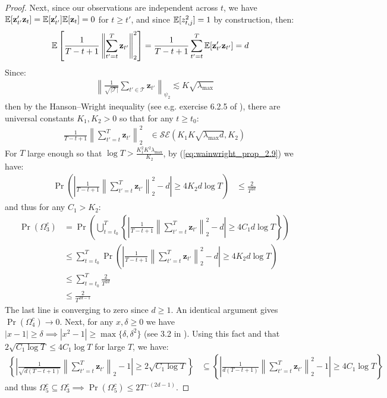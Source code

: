 \begin{proof}
Next, since our observations are independent across $t$, we have $\mathbb{E}[\mathbf{z}'_{t'}\mathbf{z}_{t}] = \mathbb{E}[\mathbf{z}'_{t'}]\mathbb{E}[\mathbf{z}_{t}] = 0$ for $t \geq t'$, and since $\mathbb{E}[z_{t,j}^2] = 1$ by construction, then:
\begin{align*}
    \mathbb{E}\left[ \frac{1}{T-t+1}\left\lVert\sum_{t'=t}^T\mathbf{z}_{t'}\right\rVert_2^2\right] &=  \frac{1}{T-t+1}\sum_{t'=t}^T\mathbb{E}[\mathbf{z}'_{t'}\mathbf{z}_{t'}] = d
\end{align*}
Since:
\begin{align*}
    \left\lVert\frac{1}{\sqrt{|\mathcal{T}|}}\sum_{t'\in\mathcal{T}}\mathbf{z}_{t'}\right\rVert_{\psi_2} \lesssim K\sqrt{\lambda_{\max}}
\end{align*}
then by the Hanson–Wright inequality (see e.g. exercise 6.2.5 of \citealp{Vershynin18}), there are universal constants $K_1,K_2>0$ so that for any $t \geq t_0$:
\begin{align*}
    \frac{1}{T-t+1}\left\lVert\sum_{t'=t}^T\mathbf{z}_{t'}\right\rVert_2^2 &\in \mathcal{SE}(K_1K\sqrt{\lambda_{\max}d},K_2) 
\end{align*}
For $T$ large enough so that $\log T > \frac{K_1^2K^2\lambda_{\max}}{K_2}$, by (\ref{eq:wainwright_prop_2.9}) we have: 
\begin{align*}
    \Pr\left(\left| \frac{1}{T-t+1}\left\lVert\sum_{t'=t}^T\mathbf{z}_{t'}\right\rVert_2^2 - d\right| \geq 4K_2d\log T\right) &\leq \frac{2}{T^{2d}}
\end{align*}
and thus for any $C_1 > K_2$:
\begin{align*}
    \Pr(\Omega^c_3) &= \Pr\left(\bigcup_{t= t_0}^T \left\{\left| \frac{1}{T-t+1}\left\lVert\sum_{t'=t}^T\mathbf{z}_{t'}\right\rVert_2^2 - d\right| \geq 4 C_1 d\log T \right\} \right) \\
    &\leq \sum_{t = t_0}^{T} \Pr\left(\left| \frac{1}{T-t+1}\left\lVert\sum_{t'=t}^T\mathbf{z}_{t'}\right\rVert_2^2 - d\right| \geq  4 K_2 d \log T \right) \tag{union bound and $C_1 > K_2$} \\
    &\leq \sum_{t = t_0}^{T} \frac{2}{T^{2d}} \\
    &\leq \frac{2}{T^{2d - 1}}
\end{align*}
The last line is converging to zero since $d \geq 1$. An identical argument gives $\Pr(\Omega^c_4) \to 0$. Next, for any $x,\delta \geq 0$ we have $|x - 1| \geq \delta \implies |x^2 - 1| \geq \max\{\delta, \delta^2\}$ (see 3.2 in \citealp{Vershynin18}). Using this fact and that $2\sqrt{C_1 \log T} \leq 4C_1 \log T$ for large $T$, we have:
\begin{align*}
    \left\{\left|\frac{1}{\sqrt{d(T-t+1)}}\left\lVert\sum_{t'=t}^T \mathbf{z}_{t'}\right\rVert_2 -1 \right| \geq  2\sqrt{ C_1 \log T}\right\} &\subseteq \left\{\left|\frac{1}{d(T-t+1)}\left\lVert\sum_{t'=t}^T \mathbf{z}_{t'}\right\rVert^2_2 -1 \right| \geq 4 C_1 \log T \right\} 
\end{align*}
and thus $\Omega_5^c \subseteq \Omega_3^c \implies \Pr(\Omega_5^c) \leq 2T^{-(2d-1)}$.

\end{proof}

